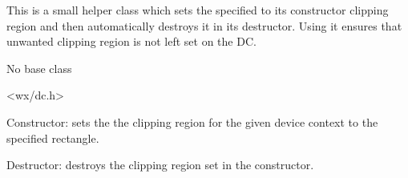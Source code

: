 This is a small helper class which sets the specified to its constructor
clipping region and then automatically destroys it in its destructor. Using
it ensures that unwanted clipping region is not left set on the DC.


No base class


<wx/dc.h>








Constructor: sets the the clipping region for the given device context to the
specified rectangle.




Destructor: destroys the clipping region set in the constructor.

